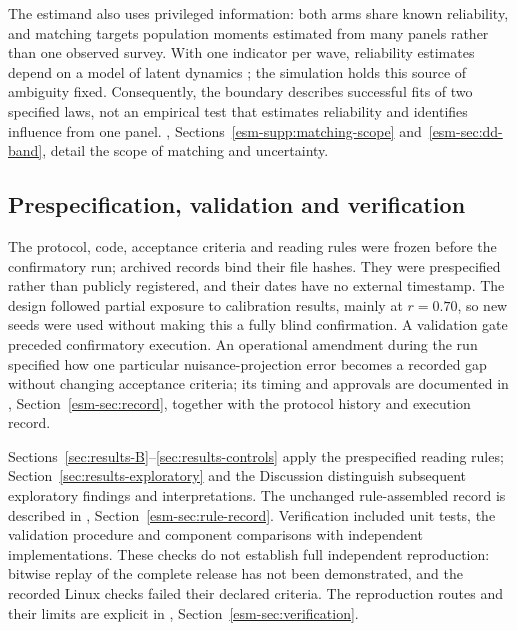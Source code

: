 The estimand also uses privileged information: both arms share known reliability, and matching targets population moments estimated from many panels rather than one observed survey. With one indicator per wave, reliability estimates depend on a model of latent dynamics \cite{heise1969,wiley1970,kenny1995tse}; the simulation holds this source of ambiguity fixed. Consequently, the boundary describes successful fits of two specified laws, not an empirical test that estimates reliability and identifies influence from one panel. \esmresource, Sections~\ref{esm-supp:matching-scope} and~\ref{esm-sec:dd-band}, detail the scope of matching and uncertainty.

\subsection{Prespecification, validation and verification}\label{sec:methods-record}

The protocol, code, acceptance criteria and reading rules were frozen before the confirmatory run; archived records bind their file hashes. They were prespecified rather than publicly registered, and their dates have no external timestamp. The design followed partial exposure to calibration results, mainly at $r=0.70$, so new seeds were used without making this a fully blind confirmation. A validation gate preceded confirmatory execution. An operational amendment during the run specified how one particular nuisance-projection error becomes a recorded gap without changing acceptance criteria; its timing and approvals are documented in \esmresource, Section~\ref{esm-sec:record}, together with the protocol history and execution record.

Sections~\ref{sec:results-B}--\ref{sec:results-controls} apply the prespecified reading rules; Section~\ref{sec:results-exploratory} and the Discussion distinguish subsequent exploratory findings and interpretations. The unchanged rule-assembled record is described in \esmresource, Section~\ref{esm-sec:rule-record}. Verification included unit tests, the validation procedure and component comparisons with independent implementations. These checks do not establish full independent reproduction: bitwise replay of the complete release has not been demonstrated, and the recorded Linux checks failed their declared criteria. The reproduction routes and their limits are explicit in \esmresource, Section~\ref{esm-sec:verification}.
